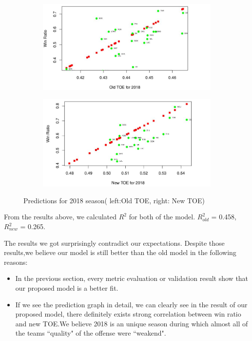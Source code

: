 \documentclass[11pt]{article}
\begin{document}
\begin{figure}[h!]
  \centering
  \begin{subfigure}[b]{0.45\linewidth}
    \includegraphics[width=\linewidth]{old_toe.jpg}
  \end{subfigure}
  \begin{subfigure}[b]{0.45\linewidth}
    \includegraphics[width=\linewidth]{new_toe_pred.jpg}
  \end{subfigure}
  \caption{Predictions for 2018 season( left:Old TOE, right: New TOE)}
\end{figure}
From the results above, we calculated $R^2$ for both of the model. $R^2_{old}$ = 0.458, $R^2_{new}$ = 0.265.

The results we got surprisingly contradict our expectations. 
Despite those results,we believe our model is still better than the old model in the following reasons:
\begin{itemize}
\item In the previous section, every metric evaluation or validation result show that our proposed model is a better fit.
\item If we see the prediction graph in detail, we can clearly see in the result of our proposed model, there definitely exists strong correlation between win ratio and new TOE.We believe 2018 is an unique season during which almost all of the teams ``quality" of the offense were ``weakend".
\end{itemize}
\end{document}
